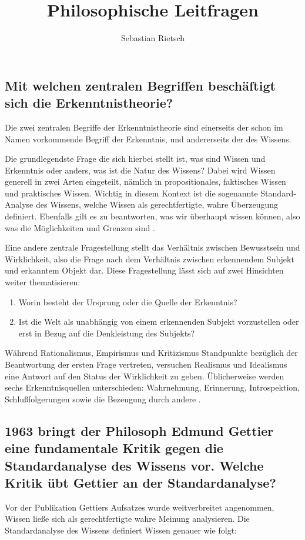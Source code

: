 \documentclass[a4paper]{article}
\title{Philosophische Leitfragen}
\date{}
\author{Sebastian Rietsch}
\begin{document}
\maketitle

\setcounter{section}{1}
\setcounter{subsection}{0}
\subsection{Mit welchen zentralen Begriffen beschäftigt sich die Erkenntnistheorie?}
Die zwei zentralen Begriffe der Erkenntnistheorie sind einerseits der schon im Namen vorkommende Begriff der Erkenntnis, und andererseits der des Wissens. 

Die grundlegendste Frage die sich hierbei stellt ist, was sind Wissen und Erkenntnis oder anders, was ist die Natur des Wissens? Dabei wird Wissen generell in zwei Arten eingeteilt, nämlich in propositionales, faktisches Wissen und praktisches Wissen. Wichtig in diesem Kontext ist die sogenannte Standard-Analyse des Wissens, welche Wissen als gerechtfertigte, wahre Überzeugung definiert. Ebenfalls gilt es zu beantworten, was wir überhaupt wissen können, also was die Möglichkeiten und Grenzen sind \cite{vl1}.

Eine andere zentrale Fragestellung stellt das Verhältnis zwischen Bewusstsein und Wirklichkeit, also die Frage nach dem Verhältnis zwischen erkennendem Subjekt und erkanntem Objekt dar. Diese Fragestellung lässt sich auf zwei Hinsichten weiter thematisieren:

\begin{enumerate}
    \item
        Worin besteht der Ursprung oder die Quelle der Erkenntnis?
    \item
        Ist die Welt als unabhängig von einem erkennenden Subjekt vorzustellen oder erst in Bezug auf die Denkleistung des Subjekts?
\end{enumerate}
Während Rationalismus, Empirismus und Kritizismus Standpunkte bezüglich der Beantwortung der ersten Frage vertreten, versuchen Realismus und Idealismus eine Antwort auf den Status der Wirklichkeit zu geben. Üblicherweise werden sechs Erkenntnisquellen unterschieden: Wahrnehmung, Erinnerung, Introspektion, Schlußfolgerungen sowie die Bezeugung durch andere \cite[151 f.]{metzler}.

\setcounter{section}{2}
\setcounter{subsection}{0}
\subsection{1963 bringt der Philosoph Edmund Gettier eine fundamentale Kritik gegen die Standardanalyse des Wissens vor. Welche Kritik übt Gettier an der Standardanalyse?}
Vor der Publikation Gettiers Aufsatzes wurde weitverbreitet angenommen, Wissen ließe sich als gerechtfertigte wahre Meinung analysieren. Die Standardanalyse des Wissens definiert Wissen genauer wie folgt:
\end{document}
